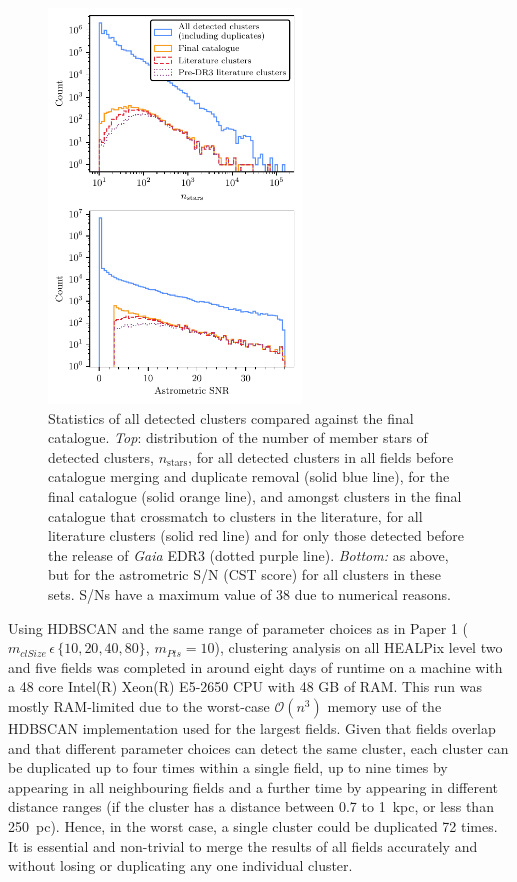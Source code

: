\begin{figure}[p]
   \centering
   \includegraphics[width=0.6\textwidth]{fig/c3/fig_data_csts.pdf}
   \caption[Statistics of all detected clusters compared against the final catalogue]{Statistics of all detected clusters compared against the final catalogue. \emph{Top}: distribution of the number of member stars of detected clusters, $n_\text{stars}$, for all detected clusters in all fields before catalogue merging and duplicate removal (solid blue line), for the final catalogue (solid orange line), and amongst clusters in the final catalogue that crossmatch to clusters in the literature, for all literature clusters (solid red line) and for only those detected before the release of \emph{Gaia} EDR3 (dotted purple line). \emph{Bottom:} as above, but for the astrometric S/N (CST score) for all clusters in these sets. S/Ns have a maximum value of 38 due to numerical reasons.}%
   \label{c3:fig:cst_histogram}
\end{figure}

Using HDBSCAN and the same range of parameter choices as in Paper 1 ($m_{clSize}\,\epsilon\,\{10,20,40,80\}$, $m_{Pts}=10$), clustering analysis on all HEALPix level two and five fields was completed in around eight days of runtime on a machine with a 48 core Intel(R) Xeon(R) E5-2650 CPU with 48 GB of RAM. This run was mostly RAM-limited due to the worst-case $\mathcal{O}(n^3)$ memory use of the HDBSCAN implementation used for the largest fields. Given that fields overlap and that different parameter choices can detect the same cluster, each cluster can be duplicated up to four times within a single field, up to nine times by appearing in all neighbouring fields and a further time by appearing in different distance ranges (if the cluster has a distance between 0.7 to 1~kpc, or less than 250~pc). Hence, in the worst case, a single cluster could be duplicated 72 times. It is essential and non-trivial to merge the results of all fields accurately and without losing or duplicating any one individual cluster.

